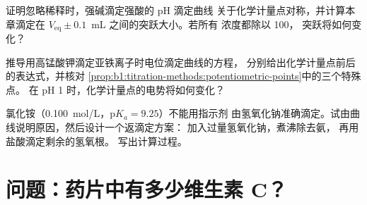 \begin{exercise}[$\star\star\star$]\label{exo:b1:titration-methods:10}
证明忽略稀释时，强碱滴定强酸的 pH 滴定曲线
关于化学计量点对称，并计算本章滴定在
$V_{\mathrm{eq}} \pm 0.1$~mL 之间的突跃大小。若所有
浓度都除以 100，
突跃将如何变化？
\end{exercise}

\begin{exercise}[$\star\star\star$]\label{exo:b1:titration-methods:11}
推导用高锰酸钾滴定亚铁离子时电位滴定曲线的方程，
分别给出化学计量点前后的表达式，并核对
\cref{prop:b1:titration-methods:potentiometric-points}中的三个特殊点。
在 pH 1 时，化学计量点的电势将如何变化？
\end{exercise}

\begin{exercise}[$\star\star\star$]\label{exo:b1:titration-methods:12}
氯化铵（\qty{0.100}{mol/L}，$\mathrm{p}K_a = 9.25$）不能用指示剂
由氢氧化钠准确滴定。试由曲线说明原因，然后设计一个返滴定方案：
加入过量氢氧化钠，煮沸除去氨，
再用盐酸滴定剩余的氢氧根。
写出计算过程。
\end{exercise}

\section{问题：药片中有多少维生素 C？}


